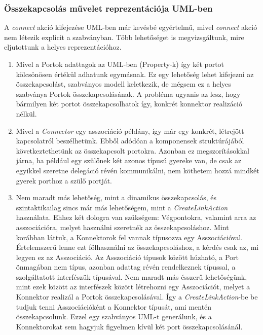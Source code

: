\documentclass[a4paper,12pt]{report}
\begin{document}
\subsubsection{Összekapcsolás művelet reprezentációja UML-ben}
A \textit{connect} akció kifejezése UML-ben már kevésbé egyértelmű, mivel \textit{connect} akció nem létezik explicit a szabványban. Több lehetőséget is megvizsgáltunk, mire eljutottunk a helyes reprezentációhoz.
\begin{enumerate}
\item Mivel a Portok adattagok az UML-ben (Property-k) így két portot kölcsönösen értékül adhatunk egymásnak. Ez egy lehetőség lehet kifejezni az összekapcsolást, szabványos modell keletkezik, de mégsem ez a helyes szabványa Portok összekapcsolásának. A probléma ugyanis az lesz, hogy bármilyen két portot összekapcsolhatok így, konkrét konnektor realizáció nélkül.
\item Mivel a \textit{Connector} egy asszociáció példány, így már egy konkrét, létrejött kapcsolatról beszélhetünk. Ebből adódóan a komponensek struktúrájából következtethetünk az összekapcsolt portokra. Azonban ez megszorításokkal járna, ha például egy szülőnek két azonos típusú gyereke van, de csak az egyikkel szeretne delegáció révén kommunikálni, nem köthetem hozzá mindkét gyerek porthoz a szülő portját.
\item Nem maradt más lehetőség, mint a dinamikus összekapcsolás, és szintaktikailag sincs már más lehetőségem, mint a \textit{CreateLinkAction} használata. Ehhez két dologra van szükségem: Végpontokra, valamint arra az asszociációra, melyet használni szeretnék az összekapcsoláshoz. Mint korábban láttuk, a Konnektorok fel vannak típusozva egy Asszociációval. Értelemszerű lenne ezt fölhasználni az összekapcsoláshoz, a kérdés csak az, mi legyen ez az Asszociáció. Az Asszociáció típusok között húzható, a Port önmagában nem típus, azonban adattag révén rendelkeznek típussal, a szolgáltatott interfészük típusával. Nem maradt más ésszerű lehetőségünk, mint ezek között az interfészek között létrehozni egy Asszociációt, melyet a Konnektor realizál a Portok összekapcsolásával. Így a \textit{CreateLinkAction}-be be tudjuk tenni Asszociációként a Konnektor típusát, ami mentén összekapcsolunk. Ezzel egy szabványos UML-t generálunk, és a Konnektorokat sem hagyjuk figyelmen kívül két port összekapcsolásánál.
\end{enumerate}
\end{document}
